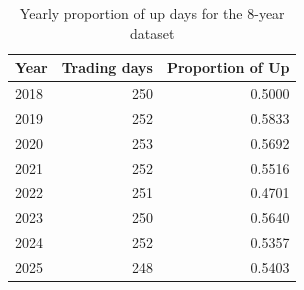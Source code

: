 \begin{table}[htbp]
\centering
\begin{tabular}{lrr}
\hline
Year & Trading days & Proportion of Up \\
\hline
2018 & 250 & 0.5000 \\
2019 & 252 & 0.5833 \\
2020 & 253 & 0.5692 \\
2021 & 252 & 0.5516 \\
2022 & 251 & 0.4701 \\
2023 & 250 & 0.5640 \\
2024 & 252 & 0.5357 \\
2025 & 248 & 0.5403 \\
\hline
\end{tabular}
\caption{Yearly proportion of up days for the 8-year dataset}
\label{tab:y_up_proportion_by_year_8yrs}
\end{table}
